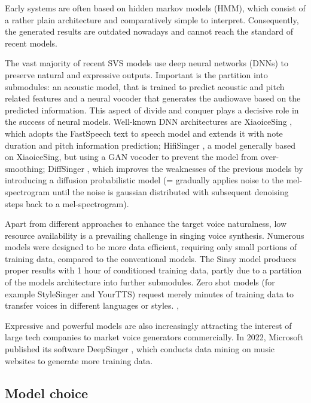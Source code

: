 \documentclass[a4paper]{article}
\begin{document}
	Early systems are often based on hidden markov models (HMM), which consist of a rather plain architecture and comparatively simple to interpret. Consequently, the generated results are outdated nowadays and cannot reach the standard of recent models. \cite{Cho2021}
	
	The vast majority of recent SVS models use deep neural networks (DNNs) to preserve natural and expressive outputs. Important is the partition into submodules: an acoustic model, that is trained to predict acoustic and pitch related features and a neural vocoder that generates the audiowave based on the predicted information. This aspect of divide and conquer plays a decisive role in the success of neural models. Well-known DNN architectures are XiaoiceSing \cite{Cho2021}, which adopts the FastSpeech text to speech model and extends it with note duration and pitch information prediction; HifiSinger \cite{Cho2021}, a model generally based on XiaoiceSing, but using a GAN vocoder to prevent the model from over-smoothing; DiffSinger \cite{DiffSinger2021}, which improves the weaknesses of the previous models by introducing a diffusion probabilistic model (= gradually applies noise to the mel-spectrogram until the noise is gaussian distributed with subsequent denoising steps back to a mel-spectrogram).
	
	Apart from different approaches to enhance the target voice naturalness, low resource availability is a prevailing challenge in singing voice synthesis. Numerous models were designed to be more data efficient, requiring only small portions of training data, compared to the conventional models. The Sinsy \cite{Cho2021} model produces proper results with 1 hour of conditioned training data, partly due to a partition of the models architecture into further submodules. Zero shot models (for example StyleSinger and YourTTS) request merely minutes of training data to transfer voices in different languages or styles. \cite{Casanova2021},\cite{Zhang2024}
	
	Expressive and powerful models are also increasingly attracting the interest of large tech companies to market voice generators commercially. In 2022, Microsoft published its software DeepSinger \cite{Ren2020}, which conducts data mining on music websites to generate more training data. 
	
	\subsection{Model choice}
	
\end{document}
